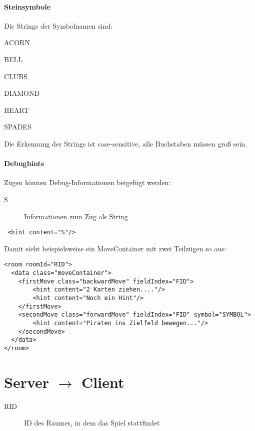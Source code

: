 \documentclass[12pt,a4paper, ngerman, oneside]{scrartcl}
\begin{document}
\subsection{\label{stoneSymbols}Steinsymbole}
Die Strings der Symbolnamen sind:
\begin{compactenum}
\item ACORN
\item BELL
\item CLUBS
\item DIAMOND
\item HEART
\item SPADES
\end{compactenum}
Die Erkennung der Strings ist case-sensitive, alle Buchstaben müssen groß
sein.

\subsection{Debughints}
Zügen können Debug-Informationen beigefügt werden:
\begin{description}
\item[S] Informationen zum Zug als String
\end{description}
\begin{verbatim}
 <hint content="S"/>
\end{verbatim}
Damit sieht beispielsweise ein MoveContainer mit zwei Teilzügen so aus:
\begin{verbatim}
<room roomId="RID">
  <data class="moveContainer">
    <firstMove class="backwardMove" fieldIndex="FID">
     	<hint content="2 Karten ziehen...."/>
     	<hint content="Noch ein Hint"/>
    </firstMove>
    <secondMove class="forwardMove" fieldIndex="FID" symbol="SYMBOL">
    	<hint content="Piraten ins Zielfeld bewegen..."/>
    </secondMove>
  </data>
</room>
\end{verbatim}



\newpage
\part{Server $\rightarrow$ Client}
\begin{description}
\item[RID] ID des Raumes, in dem das Spiel stattfindet
\end{description}
\end{document}
